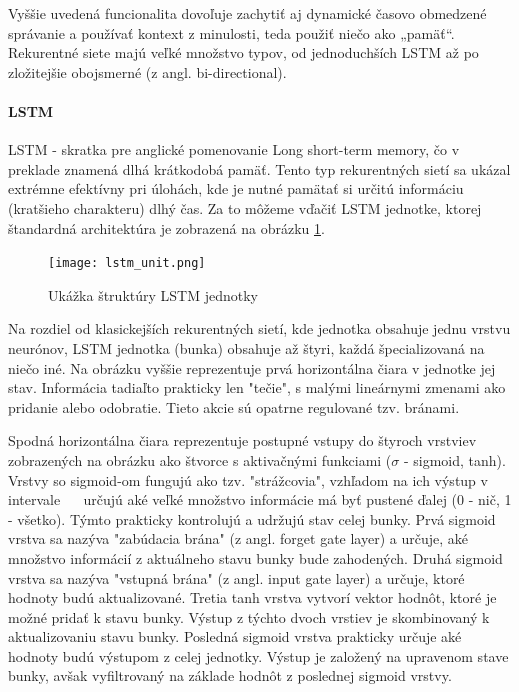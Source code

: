 Vyššie uvedená funcionalita dovoľuje zachytiť aj dynamické časovo obmedzené správanie a používať kontext z minulosti, teda použiť niečo ako „pamäť“. Rekurentné siete majú veľké množstvo typov, od jednoduchších LSTM až po zložitejšie obojsmerné (z angl. bi-directional).

\paragraph{LSTM} 
LSTM - skratka pre anglické pomenovanie Long short-term memory, čo v preklade znamená dlhá krátkodobá pamäť. Tento typ rekurentných sietí sa ukázal extrémne efektívny pri úlohách, kde je nutné pamätať si určitú informáciu (kratšieho charakteru) dlhý čas. Za to môžeme vďačiť LSTM jednotke, ktorej štandardná architektúra je zobrazená na obrázku \ref{lstm_unit_image}.

\begin{figure}[H]
	\begin{center}\texttt{[image: lstm\_unit.png]}\end{center}
	\caption[Zobrazenie LSTM jednotky]{Ukážka štruktúry LSTM jednotky\label{lstm_unit_image}}
	
\end{figure}

Na rozdiel od klasickejších rekurentných sietí, kde jednotka obsahuje jednu vrstvu neurónov, LSTM jednotka (bunka) obsahuje až štyri, každá špecializovaná na niečo iné. Na obrázku vyššie reprezentuje prvá horizontálna čiara v jednotke jej stav. Informácia tadiaľto prakticky len "tečie", s malými lineárnymi zmenami ako pridanie alebo odobratie. Tieto akcie sú opatrne regulované tzv. bránami.

Spodná horizontálna čiara reprezentuje postupné vstupy do štyroch vrstviev zobrazených na obrázku ako štvorce s aktivačnými funkciami ($\sigma$ - sigmoid, tanh). Vrstvy so sigmoid-om fungujú ako tzv. "strážcovia", vzhľadom na ich výstup v intervale \ <0,1> \ určujú aké veľké množstvo informácie má byť pustené ďalej (0 - nič, 1 - všetko). Týmto prakticky kontrolujú a udržujú stav celej bunky. Prvá sigmoid vrstva sa nazýva "zabúdacia brána" (z angl. forget gate layer) a určuje, aké množstvo informácií z aktuálneho stavu bunky bude zahodených. Druhá sigmoid vrstva sa nazýva "vstupná brána" (z angl. input gate layer) a určuje, ktoré hodnoty budú aktualizované. Tretia tanh vrstva vytvorí vektor hodnôt, ktoré je možné pridať k stavu bunky. Výstup z týchto dvoch vrstiev je skombinovaný k aktualizovaniu stavu bunky. Posledná sigmoid vrstva prakticky určuje aké hodnoty budú výstupom z celej jednotky. Výstup je založený na upravenom stave bunky, avšak vyfiltrovaný na základe hodnôt z poslednej sigmoid vrstvy.

